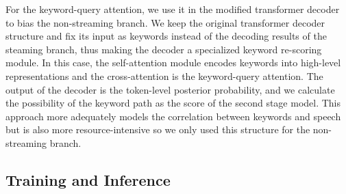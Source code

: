 \documentclass{article}
\begin{document}
For the keyword-query attention, we use it in the modified transformer decoder to bias the non-streaming branch. We keep the original transformer decoder structure and fix its input as keywords instead of the decoding results of the steaming branch, thus making the decoder a specialized keyword re-scoring module. In this case, the self-attention module encodes keywords into high-level representations and the cross-attention is the keyword-query attention. The output of the decoder is the token-level posterior probability, and we calculate the possibility of the keyword path as the score of the second stage model. This approach more adequately models the correlation between keywords and speech but is also more resource-intensive so we only used this structure for the non-streaming branch.


\subsection{Training and Inference}
\end{document}
